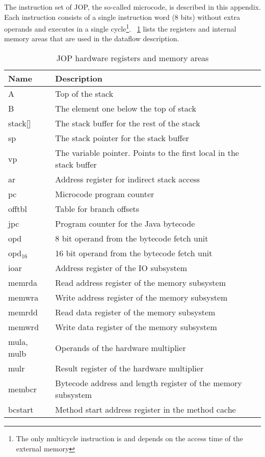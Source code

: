 %

The instruction set of JOP, the so-called microcode, is described in
this appendix. Each instruction consists of a single instruction
word (8 bits) without extra operands and executes in a single
cycle\footnote{The only multicycle instruction is 
and depends on the access time of the external memory}.
\tablename~\ref{tab:appendix:hwreg} lists the registers and internal
memory areas that are used in the dataflow description.

\begin{table}[h]
  \centering
  \begin{tabular}{ll}
    \toprule
    Name & Description \\
    \midrule
    A & Top of the stack\\
    B & The element one below the top of stack\\
    stack[] & The stack buffer for the rest of the stack\\
    sp & The stack pointer for the stack buffer\\
    vp & The variable pointer. Points to the first local in
    the stack buffer\\
    ar & Address register for indirect stack access\\
    pc & Microcode program counter\\
    offtbl & Table for branch offsets\\
    jpc & Program counter for the Java bytecode\\
    opd & 8 bit operand from the bytecode fetch unit\\
    opd$_{16}$ & 16 bit operand from the bytecode fetch unit\\
    ioar & Address register of the IO subsystem\\
    memrda & Read address register of the memory subsystem\\
    memwra & Write address register of the memory subsystem\\
    memrdd & Read data register of the memory subsystem\\
    memwrd & Write data register of the memory subsystem\\
    mula, mulb & Operands of the hardware multiplier\\
    mulr & Result register of the hardware multiplier\\
    membcr & Bytecode address and length register of the memory
    subsystem\\
    bcstart & Method start address register in the method cache\\
    \bottomrule
  \end{tabular}
  \caption{JOP hardware registers and memory areas}\label{tab:appendix:hwreg}
\end{table}

\clearpage



%

